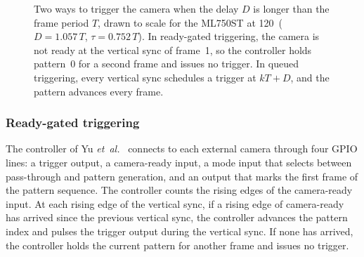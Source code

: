 \documentclass[10pt,journal,compsoc]{IEEEtran}
\newcommand{\SI}[2]{#1\,#2}
\begin{document}
\begin{figure}[t]
\centering
{}
\caption{Two ways to trigger the camera when the delay $D$ is longer than the frame
period $T$, drawn to scale for the ML750ST at \SI{120}{\hertz} ($D=1.057\,T$, $\tau=0.752\,T$). In
ready-gated triggering, the camera is not ready at the vertical sync of frame~1, so the controller
holds pattern~0 for a second frame and issues no trigger. In queued triggering, every vertical sync
schedules a trigger at $kT+D$, and the pattern advances every frame.}
\label{fig:stacking}
\end{figure}

\subsubsection{Ready-gated triggering}
The controller of Yu \emph{et~al.}~\cite{yu2020dualprojector} connects to each external camera
through four GPIO lines: a trigger output, a camera-ready input, a mode input that selects
between pass-through and pattern generation, and an output that marks the first frame of the
pattern sequence. The controller counts the rising edges of the camera-ready input. At each
rising edge of the vertical sync, if a rising edge of camera-ready has arrived since the previous
vertical sync, the controller advances the pattern index and pulses the trigger output during the
vertical sync. If none has arrived, the controller holds the current pattern for another frame
and issues no trigger.
\end{document}
